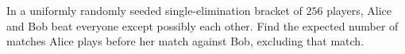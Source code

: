 In a uniformly randomly seeded single-elimination bracket of $256$ players, Alice and Bob beat everyone except possibly each other. Find the expected number of matches Alice plays before her match against Bob, excluding that match.

